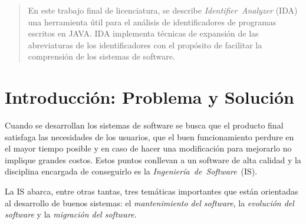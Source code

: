 \documentclass[a4paper,12pt]{report}
\begin{document}
\begin{abstract}
En este trabajo final de licenciatura, se describe \mbox{\textit{Identifier Analyzer}} (IDA) una herramienta útil para el análisis de identificadores de programas escritos en JAVA. IDA implementa técnicas de expansión de las abreviaturas de los identificadores con el propósito de facilitar la comprensión de los sistemas de software. 


\end{abstract}

%

\tableofcontents %


\chapter{Introducción: Problema y Solución}

Cuando se desarrollan los sistemas de software se busca que el producto final satisfaga las necesidades de los usuarios, que el buen funcionamiento perdure en el mayor tiempo posible y en caso de hacer una modificación para mejorarlo no implique grandes costos. Estos puntos conllevan a un software de alta calidad y la disciplina encargada de conseguirlo es la \mbox{\textit{Ingeniería de Software} (IS).}

La IS abarca, entre otras tantas, tres temáticas importantes que están orientadas al desarrollo de buenos sistemas: el \textit{mantenimiento del software}, la \textit{evolución del software} y la \textit{migración del software}. 
\end{document}
